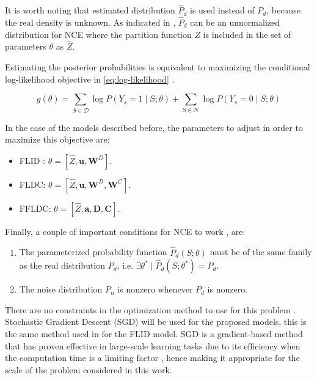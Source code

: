It is worth noting that estimated distribution $\hat{P}_{d}$ is used instead of $P_{d}$, because the real density is unknown. As indicated in \cite{Gutmann12NCE}, $\hat{P}_{d}$ can be an unnormalized distribution for NCE where the partition function $Z$ is included in the set of parameters $\theta$ as $\hat{Z}$.

Estimating the posterior probabilities is equivalent to maximizing the conditional log-likelihood objective in \ref{eq:log-likelihood} \cite{Gutmann12NCE}.

\begin{equation}
  \label{eq:log-likelihood}
  g(\theta) = \sum_{S \in \mathcal{D}}{\log{P(Y_{s} = 1 \mid S;\theta)}} + \sum_{S \in \mathcal{N}}{\log{P(Y_{s} = 0 \mid S;\theta)}}
\end{equation}

In the case of the models described before, the parameters to adjust in order to maximize this objective are:

\begin{itemize}
  \item FLID \cite{tschiatschek16learning}: $\theta = [\hat{Z}, \mathbf{u}, \mathbf{W}^D]$.
  \item FLDC: $\theta = [\hat{Z}, \mathbf{u}, \mathbf{W}^D, \mathbf{W}^{C}]$.
  \item FFLDC: $\theta = [\hat{Z}, \mathbf{a}, \mathbf{D}, \mathbf{C}]$.
\end{itemize}

Finally, a couple of important conditions for NCE to work \cite{Gutmann12NCE}, are:

\begin{enumerate}
  \item The parameterized probability function $\hat{P}_{d}(S;\theta)$ must be of the same family as the real distribution $P_{d}$, i.e. $\exists \theta^{*} \mid \hat{P}_{d}(S;\theta^{*}) = P_{d}$.
  \item The noise distribution $P_{n}$ is nonzero whenever $P_{d}$ is nonzero.
\end{enumerate}

There are no constraints in the optimization method to use for this problem \cite{Gutmann12NCE}. Stochastic Gradient Descent (SGD) will be used for the proposed models, this is the same method used in \cite{tschiatschek16learning} for the FLID model. SGD is a gradient-based method that has proven effective in large-scale learning tasks due to its efficiency when the computation time is a limiting factor \cite{Bottou2010}\cite{Zhang2004}, hence making it appropriate for the scale of the problem considered in this work.

